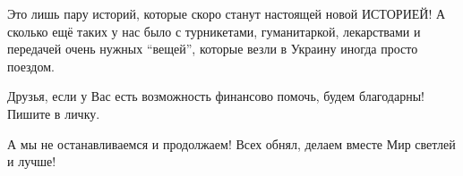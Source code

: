 Это лишь пару историй, которые скоро станут настоящей новой  ИСТОРИЕЙ! А
сколько ещё таких у нас  было с турникетами, гуманитаркой, лекарствами и
передачей очень нужных \enquote{вещей},  которые везли в Украину иногда просто
поездом.

Друзья, если у Вас есть возможность финансово помочь, будем благодарны! Пишите в личку.

А мы  не останавливаемся  и продолжаем! Всех обнял, делаем вместе Мир светлей и
лучше!


